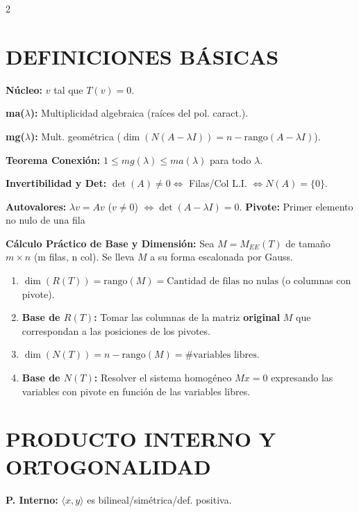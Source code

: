 \documentclass[10pt]{extarticle}
\newenvironment{term}
  {\begin{minipage}{\linewidth}}
  {\end{minipage}\par}
\begin{document}
\begin{multicols}{2}

\begin{term}
\section*{DEFINICIONES BÁSICAS}
\textbf{Núcleo:} $v$ tal que $T(v) = 0$.

\textbf{ma($\lambda$):} Multiplicidad algebraica (raíces del pol. caract.).

\textbf{mg($\lambda$):} Mult. geométrica ($\dim(N(A-\lambda I)) = n-\mathrm{rango}(A-\lambda I)$).

\textbf{Teorema Conexión:} $1 \le mg(\lambda) \le ma(\lambda)$ para todo $\lambda$.

\textbf{Invertibilidad y Det:} $\det(A)\neq 0 \iff$ Filas/Col L.I. $\iff N(A)=\{0\}$.

\textbf{Autovalores:} $\lambda v = Av$ ($v\neq 0$) $\iff \det(A-\lambda I)=0$.
\textbf{Pivote:} Primer elemento no nulo de una fila
\end{term}

\begin{term}
\textbf{Cálculo Práctico de Base y Dimensión:}
Sea $M = M_{EE}(T)$ de tamaño $m \times n$ (m filas, n col). Se lleva $M$ a su forma escalonada por Gauss.
\begin{enumerate}
\item $\dim(R(T)) = \mathrm{rango}(M) = \text{Cantidad de filas no nulas}$ (o columnas con pivote).
\item \textbf{Base de $R(T)$:} Tomar las columnas de la matriz \textbf{original} $M$ que correspondan a las posiciones de los pivotes.
\item $\dim(N(T)) = n - \mathrm{rango}(M) = \text{\# variables libres}$.
\item \textbf{Base de $N(T)$:} Resolver el sistema homogéneo $M x = 0$ expresando las variables con pivote en función de las variables libres.
\end{enumerate}
\end{term}



\begin{term}
\section*{PRODUCTO INTERNO Y ORTOGONALIDAD}
\textbf{P. Interno:} $\langle x,y\rangle$ es bilineal/simétrica/def. positiva.


\end{term}
\end{multicols}
\end{document}
